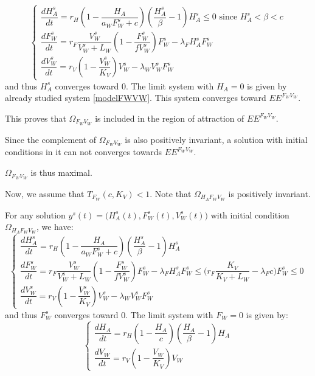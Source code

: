 \documentclass{article}
\newcommand{\lfw}{\lambda_{F}}
\newcommand{\lfv}{\lambda_{W}}
\begin{document}
\begin{equation}
\left\{ \begin{array}{l}
\dfrac{dH_A^s}{dt}= r_{H}\left(1-\dfrac{H_A}{a_WF_W^s + c}\right)\left(\dfrac{H_A^s}{\beta}-1\right)H_A^s \leq 0 \text{ since $H_A^s < \beta < c$} \\
\dfrac{dF_W^s}{dt} = r_F \dfrac{V_W^s}{V_W^s + L_W} \left(1 - \dfrac{F_W^s}{f V_W^s}\right) F_W^s - \lfw H_A^s F_W^s\\
\dfrac{dV_W^s}{dt} = r_V \left(1 - \dfrac{V_W^s}{K_V}\right) V_W^s - \lfv V_W^s F_W^s 
\end{array}\right.
\end{equation} 
and thus $H_A^s$ converges toward $0$. The limit system with $H_A = 0$ is given by already studied system \eqref{modelFWVW}. This system converges toward $EE^{F_WV_W}$.

This proves that $\Omega_{F_WV_W}$ is included in the region of attraction of $EE^{F_WV_W}$.


Since the complement of $\Omega_{F_WV_W}$ is also positively invariant, a solution with initial conditions in it can not converges towards $EE^{F_WV_W}$.

$\Omega_{F_WV_W}$ is thus maximal.

\bigskip

Now, we assume that $T_{F_W}(c, K_V) < 1$. Note that $\Omega_{H_AF_WV_W}$ is positively invariant.

For any solution $y^s(t) = \Big(H_A^s(t), F_W^s(t), V_W^s(t)\Big)$ with initial condition $\Omega_{H_AF_WV_W}$, we have:
\begin{equation}
\left\{ \begin{array}{l}
\dfrac{dH_A^s}{dt}= r_{H}\left(1-\dfrac{H_A}{a_WF_W^s + c}\right)\left(\dfrac{H_A^s}{\beta}-1\right)H_A^s \\
\dfrac{dF_W^s}{dt} = r_F \dfrac{V_W^s}{V_W^s + L_W} \left(1 - \dfrac{F_W^s}{f V_W^s}\right) F_W^s - \lfw H_A^s F_W^s \leq \Big(r_F \dfrac{K_V}{K_V + L_W} - \lfw c \Big)F^s_W \leq 0 \\
\dfrac{dV_W^s}{dt} = r_V \left(1 - \dfrac{V_W^s}{K_V}\right) V_W^s - \lfv V_W^s F_W^s 
\end{array}\right.
\end{equation} 
and thus $F_W^s$ converges toward $0$. The limit system with $F_W = 0$ is given by:
\begin{equation*}
\left\{ \begin{array}{l}
\dfrac{dH_A}{dt}= r_{H}\left(1-\dfrac{H_A}{c}\right)\left(\dfrac{H_A}{\beta}-1\right)H_A \\
\dfrac{dV_W}{dt} = r_V \left(1 - \dfrac{V_W}{K_V}\right) V_W
\end{array}\right.
\end{equation*} 
\end{document}
